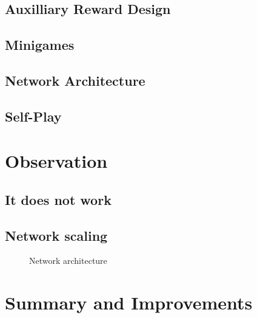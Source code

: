 \documentclass[12pt]{article}
\begin{document}
\subsection{Auxilliary Reward Design}

\subsection{Minigames} %

\subsection{Network Architecture}

\subsection{Self-Play} %



\section{Observation}
\subsection{It does not work}
\subsection{Network scaling} %

\begin{figure}
  \centering
  
  \caption{Network architecture}
\end{figure}


\section{Summary and Improvements}

\end{document}
